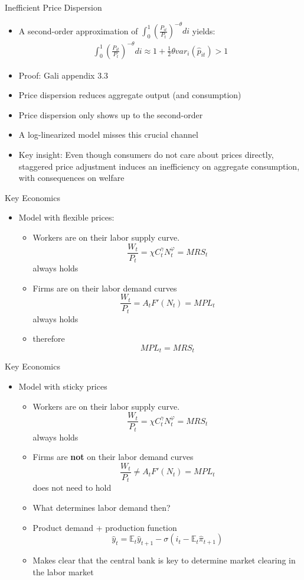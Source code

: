 \documentclass[11pt,aspectratio=169,xcolor={dvipsnames},hyperref={pdftex,pdfpagemode=UseNone,hidelinks,pdfdisplaydoctitle=true},usepdftitle=false]{beamer}
\begin{document}
\begin{frame}{Inefficient Price Dispersion}
\begin{itemize}
\item A second-order approximation of $\int_0^1 \left(\frac{P_{it}}{P_t}\right)^{-\theta} di$ yields:
\begin{align*}
\int_0^1 \left(\frac{P_{it}}{P_t}\right)^{-\theta} di \approx 1 + \frac{1}{2}\theta var_i(\hat{p}_{it}) > 1
\end{align*}
\item Proof: Gali appendix 3.3
\item Price dispersion reduces aggregate output (and consumption)
\item Price dispersion only shows up to the second-order
\item A log-linearized model misses this crucial channel
\item Key insight: Even though consumers do not care about prices directly, staggered price adjustment induces an inefficiency on aggregate consumption, with consequences on welfare
\end{itemize}
\end{frame}


\begin{frame}{Key Economics}
\begin{itemize}
\item Model with flexible prices:
\begin{itemize}
\item Workers are on their labor supply curve. 
$$\frac{W_t}{P_t} = \chi C_t^{\gamma} N_t^{\varphi} = MRS_t$$ always holds
\item Firms are on their labor demand curves
$$ \frac{W_t}{P_t} = A_t F'(N_t) = MPL_t$$ always holds
\item therefore $$MPL_t = MRS_t$$
\end{itemize}
\end{itemize}
\end{frame}

\begin{frame}{Key Economics}
\begin{itemize}
\item Model with sticky prices
\begin{itemize}
\item Workers are on their labor supply curve. 
$$\frac{W_t}{P_t} = \chi C_t^{\gamma} N_t^{\varphi} = MRS_t$$ always holds
\item Firms are \textbf{not} on their labor demand curves
$$ \frac{W_t}{P_t} \neq A_t F'(N_t) = MPL_t$$ does not need to hold
\item What determines labor demand then?
\item Product demand + production function
$$\hat{y}_t = \mathbb{E}_t \hat{y}_{t+1} - \sigma (i_t - \mathbb{E}_t \hat{\pi}_{t+1})$$
\item Makes clear that the central bank is key to determine market clearing in the labor market
\end{itemize}
\end{itemize}
\end{frame}
\end{document}
